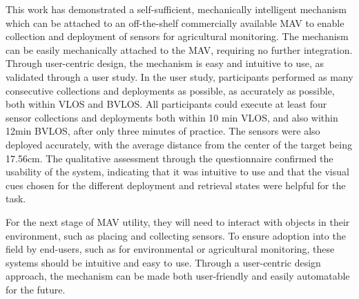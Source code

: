 This work has demonstrated a self-sufficient, mechanically intelligent mechanism which can be attached to an off-the-shelf commercially available \ac{MAV} to enable collection and deployment of sensors for agricultural monitoring. The mechanism can be easily mechanically attached to the \ac{MAV}, requiring no further integration. Through user-centric design, the mechanism is easy and intuitive to use, as validated through a user study. In the user study, participants performed as many consecutive collections and deployments as possible, as accurately as possible, both within \ac{VLOS} and \ac{BVLOS}. All participants could execute at least four sensor collections and deployments both within 10 min \ac{VLOS}, and  also within 12min \ac{BVLOS}, after only three minutes of practice. The sensors were also deployed accurately, with the average distance from the center of the target being 17.56cm. The qualitative assessment through the questionnaire confirmed the usability of the system,  indicating that it was intuitive to use and that the visual cues chosen for the different deployment and retrieval states were helpful for the task.

For the next stage of \ac{MAV} utility, they will need to interact with objects in their environment, such as placing and collecting sensors. To ensure adoption into the field by end-users, such as for environmental or agricultural monitoring, these systems should be intuitive and easy to use. Through a user-centric design approach, the mechanism can be made both user-friendly and easily automatable for the future.







